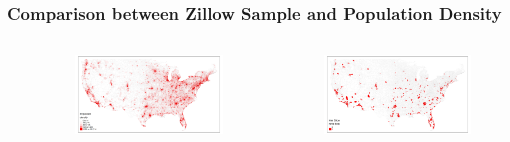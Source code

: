 \documentclass[aspectratio=169]{beamer}
\begin{document}
\begin{frame}[label = zipcodes_map]
	\frametitle{Comparison between Zillow Sample and Population Density}
    \begin{columns}\
            \hspace{-20mm}
        \begin{column}{0.46\textwidth}
            \vspace{-4mm}
            \begin{figure}
                \centering
                \includegraphics[scale = 0.34]{../../../analysis/maps_US/output/USPS_zipcodes_pop_density.png}
            \end{figure}   
        \end{column}
        \begin{column}{0.46\textwidth}
            \vspace{-4mm}
            \begin{figure}
                \centering
                \includegraphics[scale = 0.34]{../../../analysis/maps_US/output/USPS_zipcodes_zillow_data.png}
            \end{figure}   
        \end{column}
    \end{columns}
\end{frame}
\end{document}
